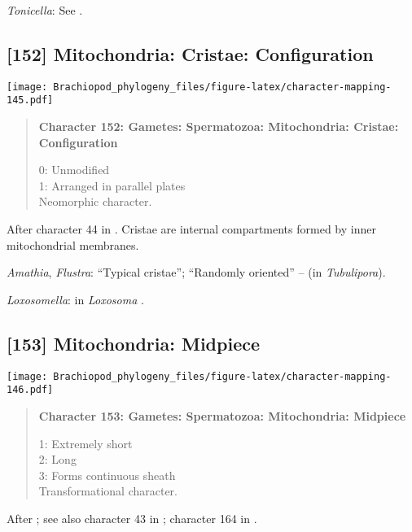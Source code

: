 \documentclass[openany]{book}
\theoremstyle{definition}
\theoremstyle{definition}
\theoremstyle{definition}
\theoremstyle{remark}
\begin{document}
\hypertarget{Tonicella-coding-151}{}
\emph{Tonicella}: See \citet{BucklandNicks1988}.

\subsection*{{[}152{]} Mitochondria: Cristae:
Configuration}\label{mitochondria-cristae-configuration}

\texttt{[image: Brachiopod\_phylogeny\_files/figure-latex/character-mapping-145.pdf]}

\begin{quote}
\textbf{Character 152: Gametes: Spermatozoa: Mitochondria: Cristae:
Configuration}

0: Unmodified\\
1: Arranged in parallel plates\\
Neomorphic character.
\end{quote}

After character 44 in \citet{Ponder1997}. Cristae are internal
compartments formed by inner mitochondrial membranes.

\hypertarget{Amathia-coding-152}{}
\emph{Amathia}, \emph{Flustra}: ``Typical cristae''; ``Randomly
oriented'' -- \citet{Franzen1984} (in \emph{Tubulipora}).

\hypertarget{Loxosomella-coding-152}{}
\emph{Loxosomella}: in \emph{Loxosoma} \citep{Franzen2000}.

\subsection*{{[}153{]} Mitochondria:
Midpiece}\label{mitochondria-midpiece}

\texttt{[image: Brachiopod\_phylogeny\_files/figure-latex/character-mapping-146.pdf]}

\begin{quote}
\textbf{Character 153: Gametes: Spermatozoa: Mitochondria: Midpiece}

1: Extremely short\\
2: Long\\
3: Forms continuous sheath\\
Transformational character.
\end{quote}

After \citet{Smith2012}; see also character 43 in \citet{Ponder1997};
character 164 in \citet{Giribet2002}.
\end{document}
